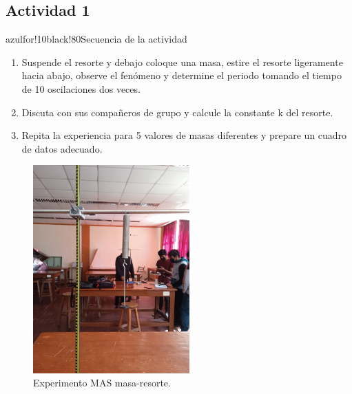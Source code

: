 \subsection{Actividad 1}
\begin{dyNoteImportant}[morado01!20]{azulfor!10}{black!80}{Secuencia de la actividad}
	\begin{enumerate}[label=\itemcirccz{miverde}{\arabic*},itemsep=2pt, leftmargin=0.6cm]
		\item Suspende el resorte y debajo coloque una masa, estire el resorte ligeramente hacia abajo, observe el fenómeno y determine el periodo tomando el tiempo de 10 oscilaciones dos veces.
		\item Discuta con sus compañeros de grupo y calcule la constante k del resorte.
		\item Repita la experiencia para 5 valores de masas diferentes y prepare un cuadro de datos adecuado.
	\end{enumerate}
\end{dyNoteImportant}

\begin{figure}[H]
	\centering
	\includegraphics[width=6cm]{Images/spring.jpeg}
	\caption{Experimento MAS masa-resorte.}\label{fig:04}
\end{figure}

